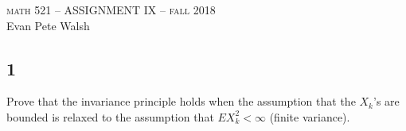 \documentclass[12pt]{article}
\begin{document}
\thispagestyle{empty}
\begin{center}
  \Large \textsc{math 521 -- ASSIGNMENT IX -- fall 2018} \\ 
  \vspace{5mm}
  \large Evan Pete Walsh
\end{center}


\subsection*{1}
\begin{tcolorbox}
  Prove that the invariance principle holds when the assumption that the $X_k$'s are bounded is relaxed to the assumption that $EX_k^2 < \infty$ (finite variance).
\end{tcolorbox}
\end{document}
